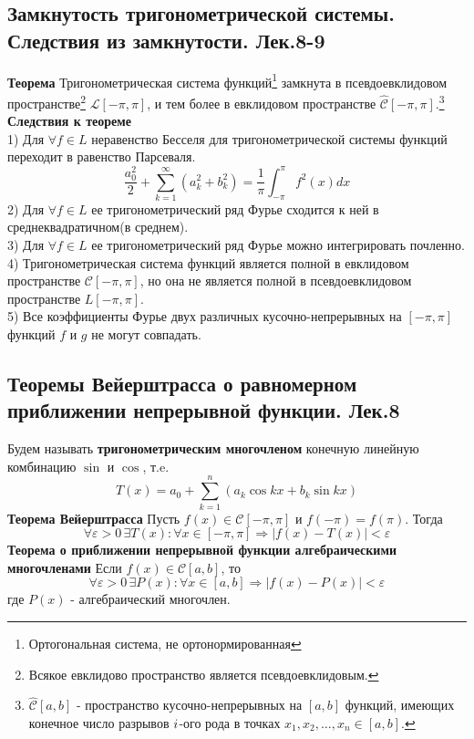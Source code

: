 \documentclass{article}
\begin{document}
\subsection{Замкнутость тригонометрической системы. Следствия из замкнутости. Лек.8-9}
	\textbf{Теорема} Тригонометрическая система функций\footnote{Ортогональная система, не ортонормированная} замкнута в псевдоевклидовом пространстве\footnote{Всякое евклидово пространство является псевдоевклидовым.} $\mathcal{L}[-\pi,\pi]$, и тем более в евклидовом пространстве $\mathcal{\hat{C}}[-\pi,\pi]$.\footnote{ $\hat{\mathcal{C}}[a, b]$ -  пространство кусочно-непрерывных на $[a, b] $ функций, имеющих конечное число разрывов $\uppercase\expandafter{\romannumeral1}$-ого рода в точках $ x_{1}, x_{2}, \ldots, x_{n} \in[a, b] $.}\\
	\textbf{Следствия к теореме}\\
	1) Для $ \forall f \in L $ неравенство Бесселя для тригонометрической системы функций переходит в равенство Парсеваля.
	\begin{equation}
	\frac{a_{0}^{2}}{2}+\sum_{k=1}^{\infty}\left(a_{k}^{2}+b_{k}^{2}\right)=\frac{1}{\pi} \int_{-\pi}^{\pi} f^{2}(x) d x
	\end{equation}
	2) Для $ \forall f \in L $ ее тригонометрический ряд Фурье сходится к ней в среднеквадратичном(в среднем).\\
	3) Для $ \forall f \in L $ ее тригонометрический ряд Фурье можно интегрировать почленно.\\
	4) Тригонометрическая система функций является полной в евклидовом пространстве $ \mathcal{C}[-\pi, \pi]$, но она не является полной в псевдоевклидовом пространстве $ L[-\pi, \pi] $.\\
	5) Все коэффициенты Фурье двух различных кусочно-непрерывных на $[-\pi,\pi] $ функций $ f $ и $ g $ не могут совпадать.\\  
\subsection{Теоремы Вейерштрасса о равномерном приближении непрерывной функции. Лек.8}
	Будем называть \textbf{тригонометрическим многочленом} конечную линейную комбинацию $\sin$ и $\cos$, т.e.
	\begin{equation}
	T(x)=a_{0}+\sum_{k=1}^{n}\left(a_{k} \cos k x+b_{k} \sin k x\right)	
	\end{equation}
	\textbf{Теорема Вейерштрасса} Пусть $ f(x) \in \mathcal{C}[-\pi, \pi] $ и $ f(-\pi)=f(\pi) $. Тогда
	\begin{equation}
	\forall\varepsilon>0\, \exists T(x): \forall x \in[-\pi, \pi] \Rightarrow|f(x)-T(x)|<\varepsilon
	\end{equation}
	\textbf{Теорема о приближении непрерывной функции алгебраическими многочленами} Если $ f(x) \in \mathcal{C}[a, b] $, то 
	\begin{equation}
	\forall\varepsilon>0\, \exists P(x): \forall x \in[a, b] \Rightarrow|f(x)-P(x)|<\varepsilon
	\end{equation}
	где $P(x)$ - алгебраический многочлен.
\end{document}
